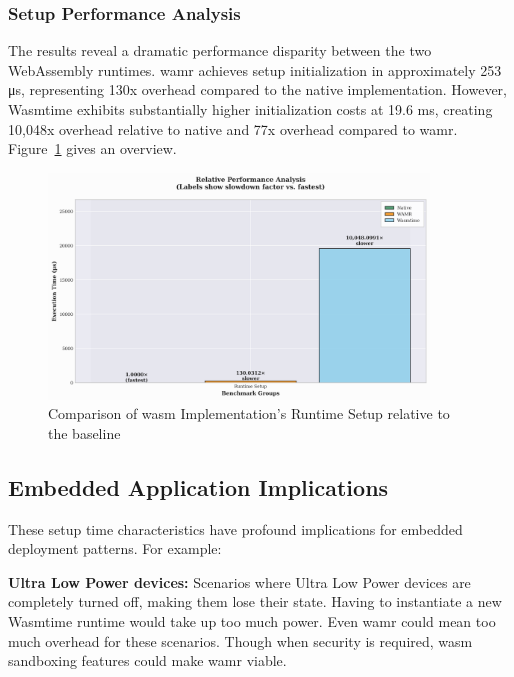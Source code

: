 \subsubsection{Setup Performance Analysis}
The results reveal a dramatic performance disparity between the two WebAssembly runtimes. \acrshort{wamr} achieves setup initialization in approximately 253 μs, representing 130x overhead compared to the native implementation. However, Wasmtime exhibits substantially higher initialization costs at 19.6 ms, creating 10,048x overhead relative to native and 77x overhead compared to \acrshort{wamr}. Figure~\ref{fig:wasm-setup-relative} gives an overview.

\begin{figure}[htbp]
    \centering
    \includegraphics[width=0.9\textwidth]{images/wasm-setup-relative}
    \caption{Comparison of \acrshort{wasm} Implementation's Runtime Setup relative to the baseline}
    \label{fig:wasm-setup-relative}
\end{figure}

\subsection{Embedded Application Implications}
\label{subsec:setup-implications}

These setup time characteristics have profound implications for embedded deployment patterns. For example:

\textbf{Ultra Low Power devices:} Scenarios where Ultra Low Power devices are completely turned off, making them lose their state. Having to instantiate a new Wasmtime runtime would take up too much power. Even \acrshort{wamr} could mean too much overhead for these scenarios. Though when security is required, \acrshort{wasm} sandboxing features could make \acrshort{wamr} viable.

